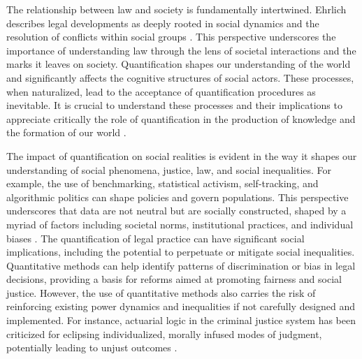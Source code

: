 The relationship between law and society is fundamentally intertwined. Ehrlich describes legal developments as deeply rooted in social dynamics and the resolution of conflicts within social groups \cite{ehrlich1967fundamentos}. This perspective underscores the importance of understanding law through the lens of societal interactions and the marks it leaves on society. Quantification shapes our understanding of the world and significantly affects the cognitive structures of social actors. These processes, when naturalized, lead to the acceptance of quantification procedures as inevitable. It is crucial to understand these processes and their implications to appreciate critically the role of quantification in the production of knowledge and the formation of our world \cite{10_1057_s41599_020_0396_5}.

The impact of quantification on social realities is evident in the way it shapes our understanding of social phenomena, justice, law, and social inequalities. For example, the use of benchmarking, statistical activism, self-tracking, and algorithmic politics can shape policies and govern populations. This perspective underscores that data are not neutral but are socially constructed, shaped by a myriad of factors including societal norms, institutional practices, and individual biases \cite{10_1057_s41599_020_0396_5}. The quantification of legal practice can have significant social implications, including the potential to perpetuate or mitigate social inequalities. Quantitative methods can help identify patterns of discrimination or bias in legal decisions, providing a basis for reforms aimed at promoting fairness and social justice. However, the use of quantitative methods also carries the risk of reinforcing existing power dynamics and inequalities if not carefully designed and implemented. For instance, actuarial logic in the criminal justice system has been criticized for eclipsing individualized, morally infused modes of judgment, potentially leading to unjust outcomes \cite{101111lsi_12334}.

